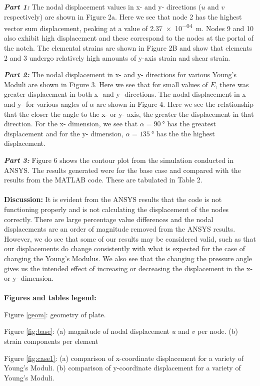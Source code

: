\documentclass[11pt]{article}
\begin{document}
\textbf{\textit{Part 1:}} The nodal displacement values in x- and y- directions ($u$ and $v$ respectively) are shown in Figure 2a. Here we see that node 2 has the highest vector sum displacement, peaking at a value of \SI{2.37e-04}{m}. Nodes 9 and 10 also exhibit high displacement and these correspond to the nodes at the portal of the notch. The elemental strains are shown in Figure 2B and show that elements 2 and 3 undergo relatively high amounts of y-axis strain and shear strain.

\textbf{\textit{Part 2:}} The nodal displacement in x- and y- directions for various Young's Moduli are shown in Figure 3. Here we see that for small values of $E$, there was greater displacement in both x- and y- directions. The nodal displacement in x- and y- for various angles of $\alpha$ are shown in Figure 4. Here we see the relationship that the closer the angle to the x- or y- axis, the greater the displacement in that direction. For the x- dimension, we see that $\alpha = \SI{90}{\degree}$ has the greatest displacement and for the y- dimension, $\alpha = \SI{135}{\degree}$ has the the highest displacement.

\textbf{\textit{Part 3:}} Figure 6 shows the contour plot from the simulation conducted in ANSYS. The results generated were for the base case and compared with the results from the MATLAB code. These are tabulated in Table 2.
\\
\\
\textbf{Discussion:}
It is evident from the ANSYS results that the code is not functioning properly and is not calculating the displacement of the nodes correctly. There are large percentage value differences and the nodal displacements are an order of magnitude removed from the ANSYS results. However, we do see that some of our results may be considered valid, such as that our displacements do change consistently with what is expected for the case of changing the Young's Modulus. We also see that the changing the pressure angle gives us the intended effect of increasing or decreasing the displacement in the x- or y- dimension.
\\
\\
\textbf{Figures and tables legend:}

Figure \ref{geom}: geometry of plate.

Figure \ref{fig:base}: (a) magnitude of nodal displacement $u$ and $v$ per node. (b) strain components per element

Figure \ref{fig:case1}: (a) comparison of x-coordinate displacement for a variety of Young's Moduli. (b) comparison of y-coordinate displacement for a variety of Young's Moduli.
\end{document}
